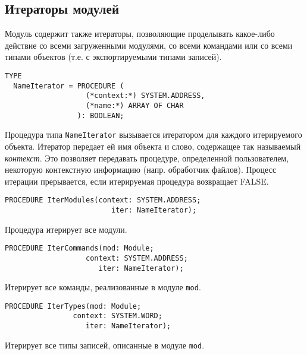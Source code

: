 \subsection{Итераторы модулей}

Модуль содержит также итераторы, позволяющие проделывать какое-либо
действие со всеми загруженными модулями, со всеми командами или 
со всеми типами объектов (т.е. с экспортируемыми типами записей).

\begin{verbatim}
TYPE
  NameIterator = PROCEDURE (
                   (*context:*) SYSTEM.ADDRESS,
                   (*name:*) ARRAY OF CHAR
                 ): BOOLEAN;
\end{verbatim}
Процедура типа {\tt NameIterator} вызывается итератором для каждого
итерируемого объекта. Итератор передает ей имя объекта и 
слово, содержащее так называемый {\em контекст}. Это позволяет
передавать процедуре, определенной пользователем, некоторую
контекстную информацию (напр. обработчик файлов). %
Процесс итерации прерывается, если итерируемая процедура 
возвращает  FALSE.

\begin{verbatim}
PROCEDURE IterModules(context: SYSTEM.ADDRESS;
                         iter: NameIterator);
\end{verbatim}
Процедура итерирует все \ot{} модули.

\begin{verbatim}
PROCEDURE IterCommands(mod: Module;
                   context: SYSTEM.ADDRESS;
                      iter: NameIterator);
\end{verbatim}
Итерирует все команды, реализованные в модуле {\tt mod}.

\begin{verbatim}
PROCEDURE IterTypes(mod: Module;
                context: SYSTEM.WORD;
                   iter: NameIterator);
\end{verbatim}
Итерирует все типы записей, описанные в модуле {\tt mod}.


